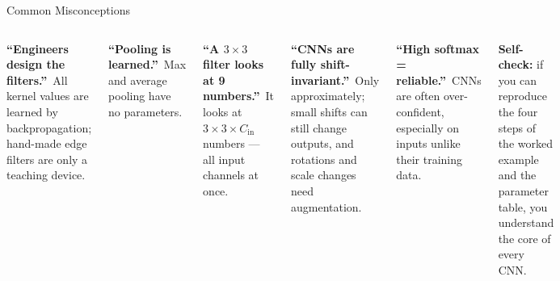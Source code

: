 \documentclass[aspectratio=169,10pt]{beamer}
\begin{document}
\begin{frame}{Common Misconceptions}
\begin{columns}[T]
\begin{wbox}\textbf{``Engineers design the filters.''}\ \scriptsize All kernel values are learned by backpropagation; hand-made edge filters are only a teaching device.\end{wbox}
\begin{wbox}\textbf{``Pooling is learned.''}\ \scriptsize Max and average pooling have no parameters.\end{wbox}
\begin{wbox}\textbf{``A $3\times3$ filter looks at 9 numbers.''}\ \scriptsize It looks at $3\times3\times C_{\text{in}}$ numbers --- all input channels at once.\end{wbox}
\begin{wbox}\textbf{``CNNs are fully shift-invariant.''}\ \scriptsize Only approximately; small shifts can still change outputs, and rotations and scale changes need augmentation.\end{wbox}
\begin{wbox}\textbf{``High softmax = reliable.''}\ \scriptsize CNNs are often over-confident, especially on inputs unlike their training data.\end{wbox}
\begin{ibox}\scriptsize\textbf{Self-check:} if you can reproduce the four steps of the worked example and the parameter table, you understand the core of every CNN.\end{ibox}
\end{columns}
\end{frame}
\end{document}
